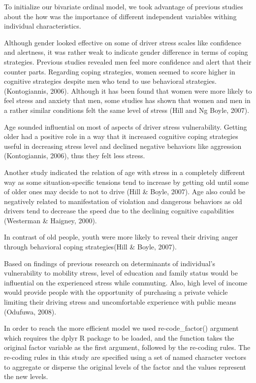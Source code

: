 \documentclass[
11pt, %
oneside, %
english, %
singlespacing, %
]{macthesis} %
\begin{document}
To initialize our bivariate ordinal model, we took advantage of previous studies about the how was the importance of different independent variables withing individual characteristics.

Although gender looked effective on some of driver stress scales like confidence and alertness, it was rather weak to indicate gender difference in terms of coping strategies. Previous studies revealed men feel more confidence and alert that their counter parts. Regarding coping strategies, women seemed to score higher in cognitive strategies despite men who tend to use behavioral strategies. (Kontogiannis, 2006). Although it has been found that women were more likely to feel stress and anxiety that men, some studies has shown that women and men in a rather similar conditions felt the same level of stress (Hill and Ng Boyle, 2007).

Age sounded influential on most of aspects of driver stress vulnerability. Getting older had a positive role in a way that it increased cognitive coping strategies useful in decreasing stress level and declined negative behaviors like aggression (Kontogiannis, 2006), thus they felt less stress.

Another study indicated the relation of age with stress in a completely different way as some situation-specific tensions tend to increase by getting old until some of older ones may decide to not to drive (Hill \& Boyle, 2007). Age also could be negatively related to manifestation of violation and dangerous behaviors as old drivers tend to decrease the speed due to the declining cognitive capabilities (Westerman \& Haigney, 2000).

In contrast of old people, youth were more likely to reveal their driving anger through behavioral coping strategies(Hill \& Boyle, 2007).

Based on findings of previous research on determinants of individual's vulnerability to mobility stress, level of education and family status would be influential on the experienced stress while commuting. Also, high level of income would provide people with the opportunity of purchasing a private vehicle limiting their driving stress and uncomfortable experience with public means (Odufuwa, 2008).

In order to reach the more efficient model we used re-code\_factor() argument which requires the dplyr R package to be loaded, and the function takes the original factor variable as the first argument, followed by the re-coding rules. The re-coding rules in this study are specified using a set of named character vectors to aggregate or disperse the original levels of the factor and the values represent the new levels.
\end{document}
